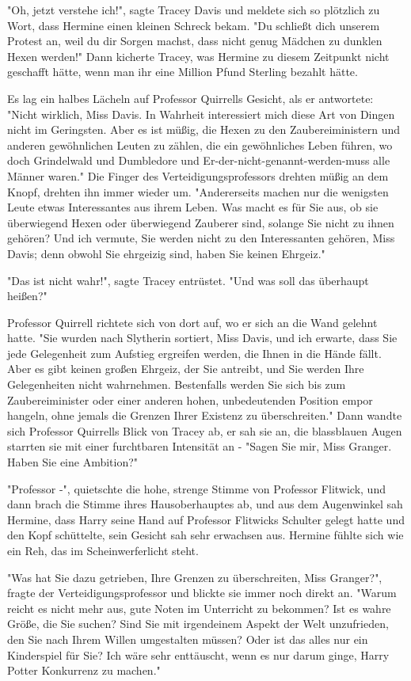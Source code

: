 {"Oh, jetzt verstehe ich!", sagte Tracey Davis und meldete sich so plötzlich zu Wort, dass Hermine einen kleinen Schreck bekam. "Du schließt dich unserem Protest an, weil du dir Sorgen machst, dass nicht genug Mädchen zu dunklen Hexen werden!" Dann kicherte Tracey, was Hermine zu diesem Zeitpunkt nicht geschafft hätte, wenn man ihr eine Million Pfund Sterling bezahlt hätte.

Es lag ein halbes Lächeln auf Professor Quirrells Gesicht, als er antwortete: "Nicht wirklich, Miss Davis. In Wahrheit interessiert mich diese Art von Dingen nicht im Geringsten. Aber es ist müßig, die Hexen zu den Zaubereiministern und anderen gewöhnlichen Leuten zu zählen, die ein gewöhnliches Leben führen, wo doch Grindelwald und Dumbledore und Er-der-nicht-genannt-werden-muss alle Männer waren." Die Finger des Verteidigungsprofessors drehten müßig an dem Knopf, drehten ihn immer wieder um. "Andererseits machen nur die wenigsten Leute etwas Interessantes aus ihrem Leben. Was macht es für Sie aus, ob sie überwiegend Hexen oder überwiegend Zauberer sind, solange Sie nicht zu ihnen gehören? Und ich vermute, Sie werden nicht zu den Interessanten gehören, Miss Davis; denn obwohl Sie ehrgeizig sind, haben Sie keinen Ehrgeiz."

"Das ist nicht wahr!", sagte Tracey entrüstet. "Und was soll das überhaupt heißen?"

Professor Quirrell richtete sich von dort auf, wo er sich an die Wand gelehnt hatte. "Sie wurden nach Slytherin sortiert, Miss Davis, und ich erwarte, dass Sie jede Gelegenheit zum Aufstieg ergreifen werden, die Ihnen in die Hände fällt. Aber es gibt keinen großen Ehrgeiz, der Sie antreibt, und Sie werden Ihre Gelegenheiten nicht wahrnehmen. Bestenfalls werden Sie sich bis zum Zaubereiminister oder einer anderen hohen, unbedeutenden Position empor hangeln, ohne jemals die Grenzen Ihrer Existenz zu überschreiten." Dann wandte sich Professor Quirrells Blick von Tracey ab, er sah sie an, die blassblauen Augen starrten sie mit einer furchtbaren Intensität an - "Sagen Sie mir, Miss Granger. Haben Sie eine Ambition?"

"Professor -", quietschte die hohe, strenge Stimme von Professor Flitwick, und dann brach die Stimme ihres Hausoberhauptes ab, und aus dem Augenwinkel sah Hermine, dass Harry seine Hand auf Professor Flitwicks Schulter gelegt hatte und den Kopf schüttelte, sein Gesicht sah sehr erwachsen aus. Hermine fühlte sich wie ein Reh, das im Scheinwerferlicht steht.

"Was hat Sie dazu getrieben, Ihre Grenzen zu überschreiten, Miss Granger?", fragte der Verteidigungsprofessor und blickte sie immer noch direkt an. "Warum reicht es nicht mehr aus, gute Noten im Unterricht zu bekommen? Ist es wahre Größe, die Sie suchen? Sind Sie mit irgendeinem Aspekt der Welt unzufrieden, den Sie nach Ihrem Willen umgestalten müssen? Oder ist das alles nur ein Kinderspiel für Sie? Ich wäre sehr enttäuscht, wenn es nur darum ginge, Harry Potter Konkurrenz zu machen."

}
